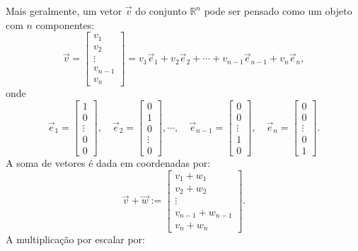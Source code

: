 Mais geralmente, um vetor $\vec{v}$ do conjunto $\mathbb{R}^n$ pode ser pensado como um objeto com $n$ componentes:
\begin{equation}
\vec{v} =
\left[
  \begin{array}{c}
    v_1 \\
    v_2 \\
   \vdots \\
    v_{n-1} \\
    v_n
  \end{array}
\right]
= v_1 \vec{e}_1 + v_2 \vec{e}_2 + \cdots + v_{n-1} \vec{e}_{n-1} + v_{n} \vec{e}_{n},
\end{equation} onde
\begin{equation}
\vec{e}_1 =
\left[
  \begin{array}{c}
    1 \\
    0 \\
  \vdots \\
    0 \\
    0
  \end{array}
\right], \quad
\vec{e}_2 =
\left[
  \begin{array}{c}
    0 \\
    1 \\
    0 \\
  \vdots \\
    0
  \end{array}
\right],   \cdots, \quad
\vec{e}_{n-1} =
\left[
  \begin{array}{c}
    0 \\
    0 \\
  \vdots \\
    1 \\
    0
  \end{array}
\right], \quad
\vec{e}_n =
\left[
  \begin{array}{c}
    0 \\
    0 \\
  \vdots \\
    0 \\
    1
  \end{array}
\right].
\end{equation} A soma de vetores é dada em coordenadas por:
\begin{equation}
\vec{v} + \vec{w} :=
\left[
  \begin{array}{c}
    v_1 + w_1 \\
    v_2 + w_2 \\
    \vdots \\
    v_{n-1} + w_{n-1} \\
    v_n + w_n
  \end{array}
\right].
\end{equation} A multiplicação por escalar por:

